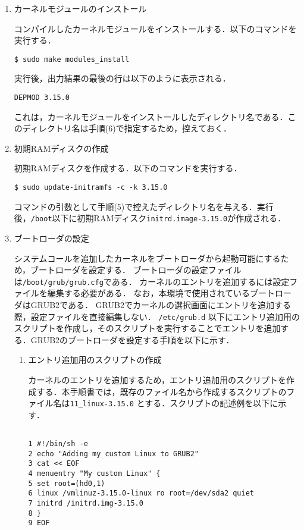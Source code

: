 \documentclass[12pt]{jsarticle}
\begin{document}
\begin{enumerate}
\item カーネルモジュールのインストール

コンパイルしたカーネルモジュールをインストールする．以下のコマンドを実行する．
\begin{verbatim}
$ sudo make modules_install
\end{verbatim}
実行後，出力結果の最後の行は以下のように表示される．
\begin{verbatim}
DEPMOD 3.15.0
\end{verbatim}
これは，カーネルモジュールをインストールしたディレクトリ名である．このディレクトリ名は手順(6)で指定するため，控えておく．

\item 初期RAMディスクの作成

初期RAMディスクを作成する．以下のコマンドを実行する．
\begin{verbatim}
$ sudo update-initramfs -c -k 3.15.0
\end{verbatim}
コマンドの引数として手順(5)で控えたディレクトリ名を与える．実行後，\verb|/boot|以下に初期RAMディスク\verb|initrd.image-3.15.0|が作成される．

\item ブートローダの設定

システムコールを追加したカーネルをブートローダから起動可能にするため，ブートローダを設定する．
ブートローダの設定ファイルは\verb|/boot/grub/grub.cfg|である．
カーネルのエントリを追加するには設定ファイルを編集する必要がある．
なお，本環境で使用されているブートローダはGRUB2である．
GRUB2でカーネルの選択画面にエントリを追加する際，設定ファイルを直接編集しない． \verb|/etc/grub.d| 以下にエントリ追加用のスクリプトを作成し，そのスクリプトを実行することでエントリを追加する．GRUB2のブートローダを設定する手順を以下に示す．


\begin{enumerate}
\item エントリ追加用のスクリプトの作成

カーネルのエントリを追加するため，エントリ追加用のスクリプトを作成する．本手順書では，既存のファイル名から作成するスクリプトのファイル名は\verb|11_linux-3.15.0| とする．スクリプトの記述例を以下に示す．
\begin{spacing}{0.7}
\begin{verbatim}

1 #!/bin/sh -e
2 echo "Adding my custom Linux to GRUB2"
3 cat << EOF
4 menuentry "My custom Linux" {
5 set root=(hd0,1)
6 linux /vmlinuz-3.15.0-linux ro root=/dev/sda2 quiet
7 initrd /initrd.img-3.15.0
8 }
9 EOF


\end{verbatim}
\end{spacing}
\end{enumerate}
\end{enumerate}
\end{document}
